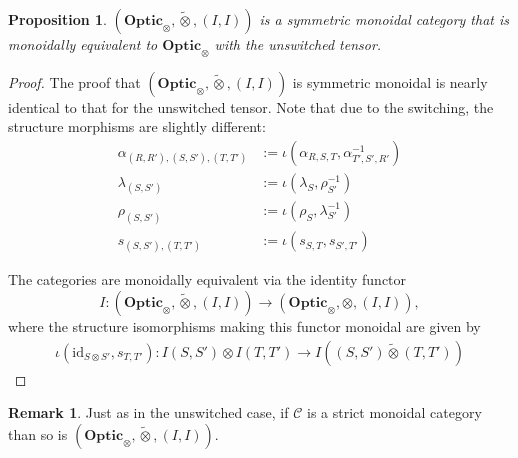 \documentclass[11pt,a4paper]{article}
\theoremstyle{plain}
\newtheorem{proposition}[theorem]{Proposition}
\theoremstyle{definition}
\newtheorem{remark}[theorem]{Remark}
\newcommand{\C}{\mathscr{C}}
\newcommand{\Optic}{\mathbf{Optic}}
\newcommand{\switched}{\mathbin{\tilde{\otimes}}}
\newcommand{\id}{\mathrm{id}}
\begin{document}
\begin{proposition}
  $(\Optic_\otimes, \switched, (I, I))$ is a symmetric monoidal category that is monoidally equivalent to $\Optic_\otimes$ with the unswitched tensor.
\end{proposition}
\begin{proof}
  The proof that $(\Optic_\otimes, \switched, (I, I))$ is symmetric monoidal is nearly identical to that for the unswitched tensor. Note that due to the switching, the structure morphisms are slightly different:
  \begin{align*}
    \alpha_{(R, R'), (S, S'), (T, T')} &:= \iota(\alpha_{R,S,T}, \alpha_{T',S',R'}^{-1}) \\
    \lambda_{(S, S')} &:= \iota(\lambda_{S}, \rho_{S'}^{-1}) \\
    \rho_{(S, S')} &:= \iota(\rho_{S}, \lambda_{S'}^{-1}) \\
    s_{(S, S'), (T, T')} &:= \iota(s_{S, T}, s_{S', T'})
  \end{align*}

  The categories are monoidally equivalent via the identity functor \[I : (\Optic_\otimes, \switched, (I, I)) \to (\Optic_\otimes, \otimes, (I, I)),\] where the structure isomorphisms making this functor monoidal are given by
  \begin{align*}
    \iota(\id_{S \otimes S'}, s_{T, T'}) : I(S, S') \otimes I(T, T') \to I((S, S') \switched (T, T'))
  \end{align*}

\end{proof}

\begin{remark}
  Just as in the unswitched case, if $\C$ is a strict monoidal category than so is $(\Optic_\otimes, \switched, (I, I))$.
\end{remark}
\end{document}
